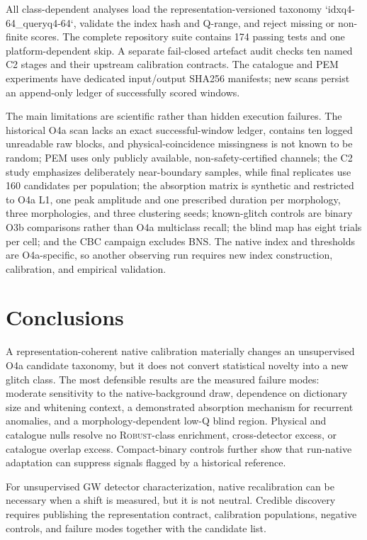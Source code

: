 \documentclass[aps,prd,twocolumn,superscriptaddress,nofootinbib,amsmath,amssymb,floatfix,10pt]{revtex4-2}
\newcommand{\robust}{\textsc{Robust}}
\begin{document}
All class-dependent analyses load the representation-versioned taxonomy
`idxq4-64\_queryq4-64`, validate the index hash and Q-range, and reject missing
or non-finite scores. The complete repository suite contains 174 passing tests
and one platform-dependent skip.
A separate
fail-closed artefact audit checks ten named C2 stages and their upstream
calibration contracts.  The catalogue and PEM experiments have dedicated
input/output SHA256 manifests; new scans persist an append-only ledger of
successfully scored windows.

The main limitations are scientific rather than hidden execution failures.
The historical O4a scan lacks an exact successful-window ledger, contains ten
logged unreadable raw blocks, and physical-coincidence missingness is not known
to be random; PEM uses only publicly available, non-safety-certified channels;
the C2 study emphasizes deliberately near-boundary samples, while final
replicates use 160 candidates per population; the absorption matrix is
synthetic and restricted to O4a L1, one peak amplitude and one prescribed
duration per morphology, three
morphologies, and three clustering seeds; known-glitch controls are binary O3b
comparisons rather than O4a multiclass recall; the blind map has
eight trials per cell; and the CBC campaign excludes BNS.  The native index and
thresholds are O4a-specific, so another observing run requires new index
construction, calibration, and empirical validation.

\section{Conclusions}

A representation-coherent native calibration materially changes an
unsupervised O4a candidate taxonomy, but it does not convert statistical
novelty into a new glitch class.  The most defensible results are the measured
failure modes: moderate sensitivity to the native-background draw, dependence
on dictionary size and whitening context, a demonstrated absorption mechanism
for recurrent anomalies, and a morphology-dependent low-Q blind region.
Physical and
catalogue nulls resolve no \robust-class enrichment, cross-detector excess, or
catalogue overlap excess.  Compact-binary controls further show that run-native
adaptation can suppress signals flagged by a historical reference.

For unsupervised GW detector characterization, native recalibration can be
necessary when a shift is measured, but it is not neutral.  Credible discovery
requires publishing the
representation contract, calibration populations, negative controls, and
failure modes together with the candidate list.
\end{document}
